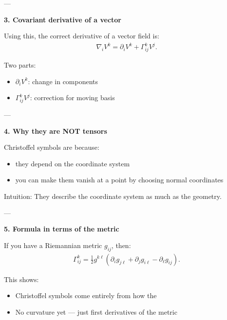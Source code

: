 \documentclass[12pt,a4paper]{report}
\begin{document}
\begin{description}

---

\item \textbf{ 3. Covariant derivative of a vector}

Using this, the correct derivative of a vector field is:
\begin{align*}
\nabla_i V^k = \partial_i V^k + \Gamma^k_{ij} V^j.
\end{align*}

Two parts:

\begin{itemize}
\item $\partial_i V^k$: change in components
\item  $\Gamma^k_{ij} V^j$: correction for moving basis
\end{itemize}

---

\item \textbf{ 4. Why they are NOT tensors}

Christoffel symbols are  because:

\begin{itemize}
\item they depend on the coordinate system
\item you can make them vanish at a point by choosing normal coordinates
\end{itemize}

Intuition:
They describe the coordinate system as much as the geometry.

---

\item \textbf{ 5. Formula in terms of the metric}

If you have a Riemannian metric $g_{ij}$, then:
\begin{align*}
\Gamma^k_{ij} = \frac{1}{2} g^{k\ell} \left( \partial_i g_{j\ell} + \partial_j g_{i\ell} - \partial_\ell g_{ij} \right).
\end{align*}

 This shows:

\begin{itemize}
\item Christoffel symbols come entirely from how the 
\item No curvature yet — just first derivatives of the metric
\end{itemize}


\end{description}
\end{document}
